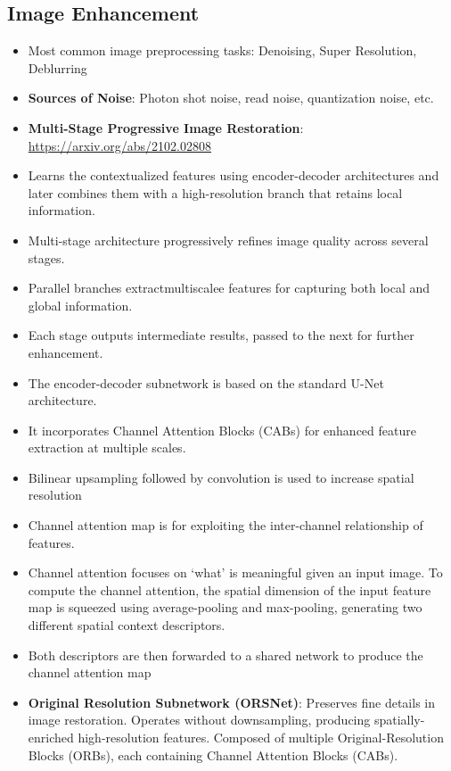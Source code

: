 \documentclass[a4paper]{article}
\begin{document}
\subsection{Image Enhancement}
\begin{itemize}
    \item Most common image preprocessing tasks: Denoising, Super Resolution, Deblurring
    \item \textbf{Sources of Noise}: Photon shot noise, read noise, quantization noise, etc.
    \item \textbf{Multi-Stage Progressive Image Restoration}: \url{https://arxiv.org/abs/2102.02808}
    \item Learns the contextualized features using encoder-decoder architectures and later combines them with a high-resolution branch that retains local information.
    \item Multi-stage architecture progressively refines image quality across several stages.
    \item Parallel branches extractmultiscalee features for capturing both local and global information.
    \item Each stage outputs intermediate results, passed to the next for further enhancement.
    \item The encoder-decoder subnetwork is based on the standard U-Net architecture.
    \item It incorporates Channel Attention Blocks (CABs) for enhanced feature extraction at multiple scales.
    \item Bilinear upsampling followed by convolution is used to increase spatial resolution
    \item Channel attention map is for exploiting the inter-channel relationship of features. 
    \item Channel attention focuses on ‘what’ is meaningful given an input image. To compute the channel attention, the spatial dimension of the input feature map is squeezed using average-pooling and max-pooling, generating two different spatial context descriptors.
    \item Both descriptors are then forwarded to a shared network to produce the channel attention map 
    \item \textbf{Original Resolution Subnetwork (ORSNet)}: Preserves fine details in image restoration. Operates without downsampling, producing spatially-enriched high-resolution features. Composed of multiple Original-Resolution Blocks (ORBs), each containing Channel Attention Blocks (CABs).

\end{itemize}
\end{document}
